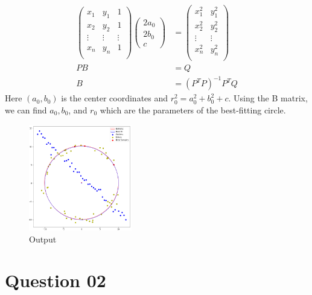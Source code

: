 \documentclass[a4paper]{article}
\begin{document}
    \begin{align*}
      \begin{pmatrix}
        x_1 & y_1 & 1\\
        x_2 & y_2 & 1\\
        \vdots & \vdots & \vdots\\
        x_n & y_n & 1\\
      \end{pmatrix}
      \begin{pmatrix}
        2a_0 \\ 2b_0 \\ c
      \end{pmatrix}&=
      \begin{pmatrix}
        x_1^2 & y_1^2\\
        x_2^2 & y_2^2\\
        \vdots & \vdots \\
        x_n^2 & y_n^2\\
      \end{pmatrix}\\
      PB&=Q\\
      B&=(P^T P)^{-1}P^T Q
    \end{align*}
    Here $(a_0,b_0)$ is the center coordinates and $r_0^2=a_0^2+b_0^2+c$. Using the B matrix, we can find
     $a_0, b_0$, and $r_0$ which are the parameters of the best-fitting
      circle.
\begin{figure}[!htb]
  \centering
  \includegraphics[width=0.4\textwidth]{images/ransac.png}
  \caption{Output}
  \label{ransac}
\end{figure}
\newpage
\section*{Question 02}
\end{document}
